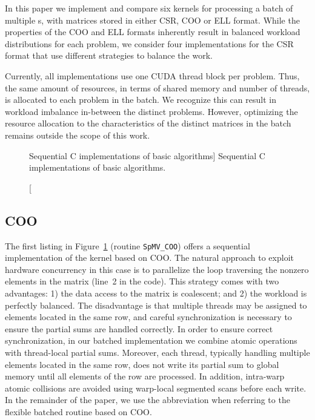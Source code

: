 In this paper we implement and compare six kernels for processing
a batch of multiple {\spmv}s, with matrices stored in either CSR, COO or ELL format.
While the properties of the COO and ELL formats inherently result in
balanced workload distributions for each problem, we consider four implementations
for the CSR format that use different strategies to balance the work.

Currently, all implementations use one CUDA thread block per problem.
Thus, the same amount of resources, in terms of
shared memory and number of threads, is allocated to each problem in the batch.
We recognize this can result in workload imbalance in-between the distinct problems.
However, optimizing the resource allocation to the characteristics of the distinct matrices in the batch remains outside the scope of this work.

\begin{figure}[t]




\caption
[Sequential C implementations of basic \spmv algorithms]
{Sequential C implementations of basic \spmv algorithms.}
\label{2017-batched-spmv:fig:spmv}
\end{figure}

\subsection{COO}
The first listing 
in Figure~\ref{2017-batched-spmv:fig:spmv} (routine {\tt SpMV\_COO}) offers a sequential implementation 
of the \spmv kernel based on COO.
The natural approach to exploit hardware concurrency in this case
is to parallelize the loop traversing the nonzero elements in the matrix
(line~2 in the code). 
This strategy comes with two advantages: 1) the data access to the matrix
is coalescent; and
2) the workload
is perfectly balanced.
The disadvantage
is that multiple threads
may be assigned to elements located in the same row, and careful synchronization 
is necessary to ensure the partial sums are handled correctly. 
In order
to ensure correct synchronization,
in our batched implementation we combine atomic operations 
with thread-local partial sums. Moreover, each thread, typically handling multiple elements
located in the same row, does not write its partial sum to global memory until
all elements of the row are processed.
In addition, intra-warp atomic collisions are avoided
using warp-local segmented scans before each write.
In the remainder of the paper, we use the abbreviation \coo when referring to the
flexible batched \spmv routine based on COO.

